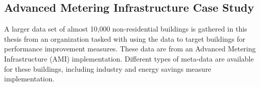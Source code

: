 \subsection{Advanced Metering Infrastructure Case Study}
\label{sec:smartmeterdata}

A larger data set of almost 10,000 non-residential buildings is gathered in this thesis from an organization tasked with using the data to target buildings for performance improvement measures. These data are from an Advanced Metering Infrastructure (AMI) implementation. Different types of meta-data are available for these buildings, including industry and energy savings measure implementation.
